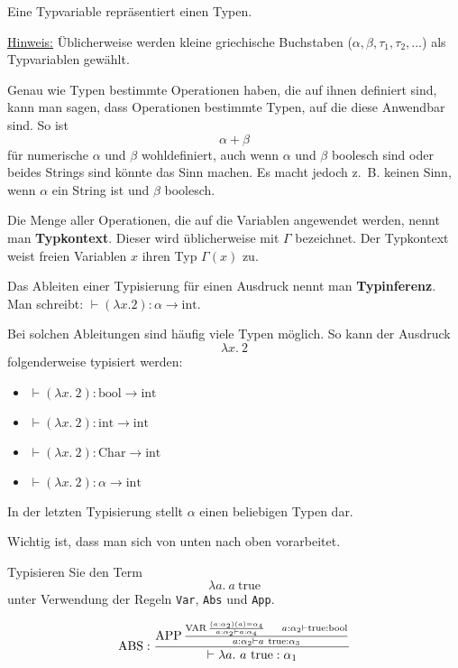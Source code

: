 \begin{definition}[Typvariable]%
	Eine Typvariable repräsentiert einen Typen.
\end{definition}

\underline{Hinweis:} Üblicherweise werden kleine griechische Buchstaben ($\alpha, \beta, \tau_1, \tau_2, \dots$) als Typvariablen gewählt.

Genau wie Typen bestimmte Operationen haben, die auf ihnen definiert sind,
kann man sagen, dass Operationen bestimmte Typen, auf die diese Anwendbar sind. So ist
\[\alpha+\beta\]
für numerische $\alpha$ und $\beta$ wohldefiniert, auch wenn $\alpha$ und $\beta$ boolesch sind
oder beides Strings sind könnte das Sinn machen. Es macht jedoch z.~B. keinen Sinn,
wenn $\alpha$ ein String ist und $\beta$ boolesch.

Die Menge aller Operationen, die auf die Variablen angewendet werden, nennt man
\textbf{Typkontext}. Dieser wird üblicherweise mit $\Gamma$
bezeichnet. Der Typkontext weist freien Variablen $x$ ihren Typ $\Gamma(x)$ zu.

Das Ableiten einer Typisierung für einen Ausdruck nennt man \textbf{Typinferenz}.
Man schreibt: $\vdash(\lambda x.2): \alpha \rightarrow \text{int}$.

Bei solchen Ableitungen sind häufig viele Typen möglich. So kann der Ausdruck
\[\lambda x.\ 2\]
folgenderweise typisiert werden:
\begin{itemize}
	\item $\vdash(\lambda x.\ 2): \text{bool} \rightarrow \text{int}$
	\item $\vdash(\lambda x.\ 2): \text{int} \rightarrow \text{int}$
	\item $\vdash(\lambda x.\ 2): \text{Char} \rightarrow \text{int}$
	\item $\vdash(\lambda x.\ 2): \alpha \rightarrow \text{int}$
\end{itemize}

In der letzten Typisierung stellt $\alpha$ einen beliebigen Typen dar.

Wichtig ist, dass man sich von unten nach oben vorarbeitet.

\begin{beispiel}
    Typisieren Sie den Term
    \[\lambda a.\ a\ \text{true}\]
    unter Verwendung der Regeln \verb+Var+, \verb+Abs+ und \verb+App+.

    \[\operatorname{ABS}: \frac{\operatorname{APP} \frac{\operatorname{VAR} \frac{(a:\alpha_2)(a) = \alpha_4}{a: \alpha_2 \vdash a: \alpha_4} \;\;\;\;\;\; a: \alpha_2 \vdash \text{true}: \text{bool}}{a: \alpha_2 \vdash a\ \text{true}: \alpha_3}}{\vdash \lambda a.\ a\ \text{true}: \alpha_1}\]
\end{beispiel}

